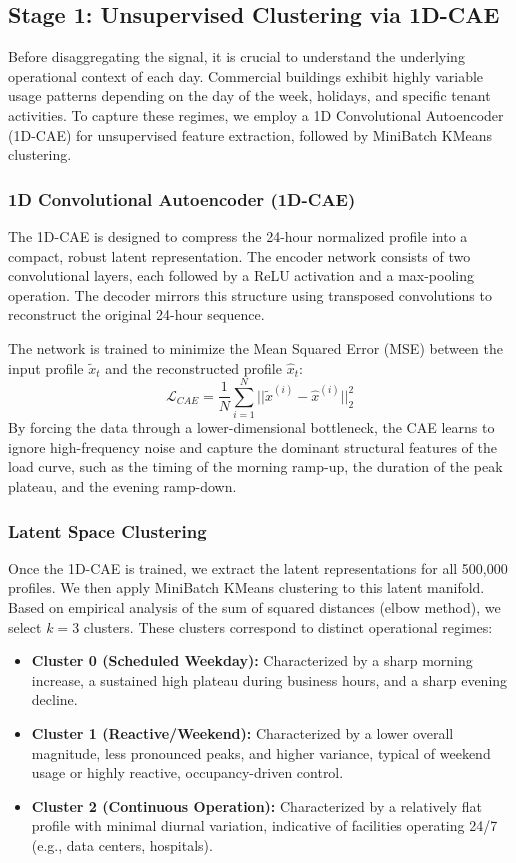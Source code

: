 \subsection{Stage 1: Unsupervised Clustering via 1D-CAE}
Before disaggregating the signal, it is crucial to understand the underlying operational context of each day. Commercial buildings exhibit highly variable usage patterns depending on the day of the week, holidays, and specific tenant activities. To capture these regimes, we employ a 1D Convolutional Autoencoder (1D-CAE) for unsupervised feature extraction, followed by MiniBatch KMeans clustering.

\subsubsection{1D Convolutional Autoencoder (1D-CAE)}
The 1D-CAE is designed to compress the 24-hour normalized profile into a compact, robust latent representation. The encoder network consists of two convolutional layers, each followed by a ReLU activation and a max-pooling operation. The decoder mirrors this structure using transposed convolutions to reconstruct the original 24-hour sequence.

The network is trained to minimize the Mean Squared Error (MSE) between the input profile $\tilde{x}_t$ and the reconstructed profile $\hat{x}_t$:
\begin{equation}
    \mathcal{L}_{CAE} = \frac{1}{N} \sum_{i=1}^{N} ||\tilde{x}^{(i)} - \hat{x}^{(i)}||_2^2
\end{equation}
By forcing the data through a lower-dimensional bottleneck, the CAE learns to ignore high-frequency noise and capture the dominant structural features of the load curve, such as the timing of the morning ramp-up, the duration of the peak plateau, and the evening ramp-down.

\subsubsection{Latent Space Clustering}
Once the 1D-CAE is trained, we extract the latent representations for all 500,000 profiles. We then apply MiniBatch KMeans clustering to this latent manifold. Based on empirical analysis of the sum of squared distances (elbow method), we select $k=3$ clusters. These clusters correspond to distinct operational regimes:
\begin{itemize}
    \item \textbf{Cluster 0 (Scheduled Weekday):} Characterized by a sharp morning increase, a sustained high plateau during business hours, and a sharp evening decline.
    \item \textbf{Cluster 1 (Reactive/Weekend):} Characterized by a lower overall magnitude, less pronounced peaks, and higher variance, typical of weekend usage or highly reactive, occupancy-driven control.
    \item \textbf{Cluster 2 (Continuous Operation):} Characterized by a relatively flat profile with minimal diurnal variation, indicative of facilities operating 24/7 (e.g., data centers, hospitals).
\end{itemize}

